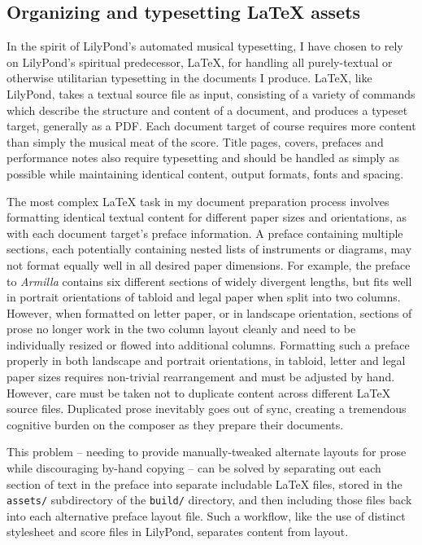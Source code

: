 \subsection{Organizing and typesetting LaTeX assets}
\label{ssec:organizing-and-typesetting-latex-assets}


In the spirit of LilyPond's automated musical typesetting, I have chosen to
rely on LilyPond's spiritual predecessor, LaTeX, for handling all
purely-textual or otherwise utilitarian typesetting in the documents I produce.
LaTeX, like LilyPond, takes a textual source file as input, consisting of a
variety of commands which describe the structure and content of a document, and
produces a typeset target, generally as a PDF. Each document target of course
requires more content than simply the musical meat of the score. Title pages,
covers, prefaces and performance notes also require typesetting and should be
handled as simply as possible while maintaining identical content, output
formats, fonts and spacing.

The most complex LaTeX task in my document preparation process involves
formatting identical textual content for different paper sizes and
orientations, as with each document target's preface information. A preface
containing multiple sections, each potentially containing nested lists of
instruments or diagrams, may not format equally well in all desired paper
dimensions. For example, the preface to \emph{Armilla} contains six
different sections of widely divergent lengths, but fits well in portrait
orientations of tabloid and legal paper when split into two columns. However,
when formatted on letter paper, or in landscape orientation, sections of prose
no longer work in the two column layout cleanly and need to be individually
resized or flowed into additional columns. Formatting such a preface
properly in both landscape and portrait orientations, in tabloid, letter and
legal paper sizes requires non-trivial rearrangement and must be adjusted by
hand. However, care must be taken not to duplicate content across different
LaTeX source files. Duplicated prose inevitably goes out of sync, creating a
tremendous cognitive burden on the composer as they prepare their documents.

This problem -- needing to provide manually-tweaked alternate layouts for prose
while discouraging by-hand copying -- can be solved by separating out each
section of text in the preface into separate includable LaTeX files, stored in
the \texttt{assets/} subdirectory of the \texttt{build/} directory, and then
including those files back into each alternative preface layout file.
Such a workflow, like the use of distinct stylesheet and score files in
LilyPond, separates content from layout.

